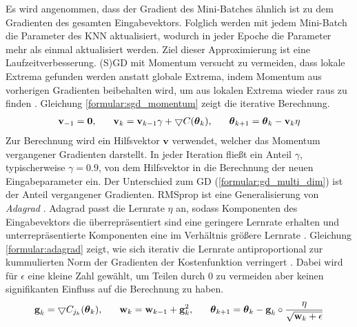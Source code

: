 Es wird angenommen, dass der Gradient des Mini-Batches ähnlich ist zu dem Gradienten des gesamten Eingabevektors.
Folglich werden mit jedem Mini-Batch die Parameter des KNN aktualisiert, wodurch in jeder Epoche die Parameter mehr als einmal aktualisiert werden.
Ziel dieser Approximierung ist eine Laufzeitverbesserung.
\newline
\newline
(S)GD mit Momentum versucht zu vermeiden, dass lokale Extrema gefunden werden anstatt globale Extrema, indem Momentum aus
vorherigen Gradienten beibehalten wird, um aus lokalen Extrema wieder raus zu finden \cite{higham2019deep}.
Gleichung \ref{formular:sgd_momentum} zeigt die iterative Berechnung.
\begin{align}
    \label{formular:sgd_momentum}
    \textbf{v}_{-1} = \textbf{0}, \hspace{0.6cm} \textbf{v}_k = \textbf{v}_{k-1}\gamma +
    \bigtriangledown C(\boldsymbol\theta_k), \hspace{0.6cm} \boldsymbol\theta_{k+1} = \boldsymbol\theta_k - \textbf{v}_k\eta
\end{align}
Zur Berechnung wird ein Hilfsvektor $\textbf{v}$ verwendet, welcher das Momentum vergangener Gradienten darstellt.
In jeder Iteration fließt ein Anteil $\gamma$, typischerweise $\gamma=0.9$, von dem Hilfsvektor in die Berechnung der neuen Eingabeparameter ein.
Der Unterschied zum GD (\ref{formular:gd_multi_dim}) ist der Anteil vergangener Gradienten.
\newline
\newline
RMSprop ist eine Generalisierung von \textit{Adagrad} \cite{mukkamala2017variants}.
Adagrad passt die Lernrate $\eta$ an, sodass Komponenten des Eingabevektors die überrepräsentiert sind eine geringere Lernrate erhalten und
unterrepräsentierte Komponenten eine im Verhältnis größere Lernrate \cite{duchi2011adaptive}.
Gleichung \ref{formular:adagrad} zeigt, wie sich iterativ die Lernrate antiproportional
zur kummulierten Norm der Gradienten der Kostenfunktion verringert \cite{lydia2019adagrad, kingma2014adam}.
Dabei wird für $\epsilon$ eine kleine Zahl gewählt, um Teilen durch 0 zu vermeiden aber keinen signifikanten Einfluss auf die Berechnung zu haben.
\begin{align}
    \label{formular:adagrad}
    \textbf{g}_k = \bigtriangledown C_{j_k}(\boldsymbol\theta_k), \hspace{0.6cm}
    \textbf{w}_k = \textbf{w}_{k-1} + \textbf{g}_k^2, \hspace{0.6cm}
    \boldsymbol\theta_{k+1} = \boldsymbol\theta_k - \textbf{g}_k \circ \frac{\eta}{\sqrt{\textbf{w}_k + \epsilon}}
\end{align}
